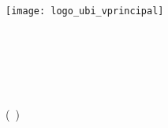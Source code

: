 \begin{titlepage}
    \begin{center}
        \begin{flushright}
            \vspace*{0.03cm}\texttt{[image: logo\_ubi\_vprincipal]}\\
            \vspace{3cm}%

            \rostotitulo \textbf{\thesistitlestr} \\
            \ifdefined\thesissubtitlestr
                \rostosubtit \textbf{\thesissubtitlestr}\\
            \fi
            \vspace{1.0cm}%
            \rostonomes \textbf{\thesisauthorsstr} \\
            \vspace{1.0cm}%
            \rostooutros \thesistypestr \\
            \rostonomes \textbf{\thesiscoursestr}\\
            \rostooutros (\studiescyclenumberstr \ \studiescycle)\\
            \vspace{0.8cm}%

            \begin{flushright}
            	\thesissupervisorsstr
            \end{flushright}
            
            \ifdefined\thesisjurystr
	            \begin{flushright}
	            	\thesisjurystr
	            \end{flushright}
            \fi
            \vspace{1.1cm}

            \rostooutros \textbf{\thesislocalanddatestr}
        \end{flushright}
    \end{center}
\end{titlepage}


\pagestyle{fancy}


\cleardoublepage

